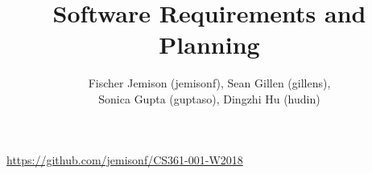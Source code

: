 \documentclass[12pt]{article}
\title{Software Requirements  and Planning}
\author{Fischer Jemison (jemisonf), Sean Gillen (gillens), \\
Sonica Gupta (guptaso), Dingzhi Hu (hudin) }
\begin{document}
\maketitle
\centerline{\url{https://github.com/jemisonf/CS361-001-W2018}}
\tableofcontents








\end{document}
